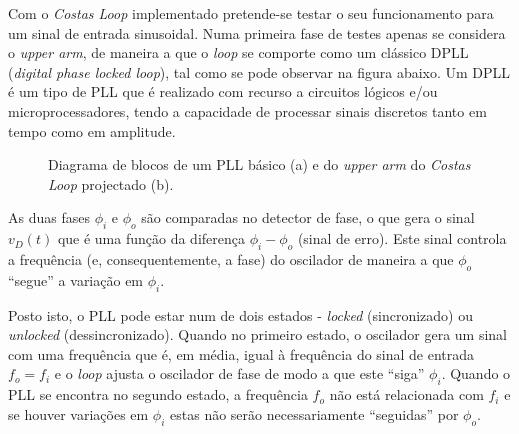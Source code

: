 \documentclass[11pt]{article}
\numberwithin{equation}{section}
\begin{document}
Com o \textit{Costas Loop} implementado pretende-se testar o seu funcionamento para um sinal de entrada sinusoidal. Numa primeira fase de testes apenas se considera o \textit{upper arm}, de maneira a que o \textit{loop} se comporte como um clássico DPLL (\textit{digital phase locked loop}), tal como se pode observar na figura abaixo. Um DPLL é um tipo de PLL que é realizado com recurso a circuitos lógicos e/ou microprocessadores, tendo a capacidade de processar sinais discretos tanto em tempo como em amplitude.

\begin{figure}[H]
	\centering
	\hspace{8mm}
	\vspace{-0.8em}
	\caption{Diagrama de blocos de um PLL básico (a) e do \textit{upper arm} do \textit{Costas Loop} projectado (b).}
	\vspace{-0.8em}
\end{figure}

As duas fases $\phi_{i}$ e $\phi_{o}$ são comparadas no detector de fase, o que gera o sinal $v_{D}\left(t\right)$ que é uma função da diferença $\phi_{i} - \phi_{o}$ (sinal de erro). Este sinal controla a frequência (e, consequentemente, a fase) do oscilador de maneira a que $\phi_{o}$ ``segue'' a variação em $\phi_{i}$.

Posto isto, o PLL pode estar num de dois estados - \textit{locked} (sincronizado) ou \textit{unlocked} (dessincronizado). Quando no primeiro estado, o oscilador gera um sinal com uma frequência que é, em média, igual à frequência do sinal de entrada $f_o = f_i$ e o \textit{loop} ajusta o oscilador de fase de modo a que este ``siga'' $\phi_{i}$. Quando o PLL se encontra no segundo estado, a frequência $f_o$ não está relacionada com $f_i$ e se houver variações em $\phi_{i}$ estas não serão necessariamente ``seguidas'' por $\phi_{o}$.
\end{document}
